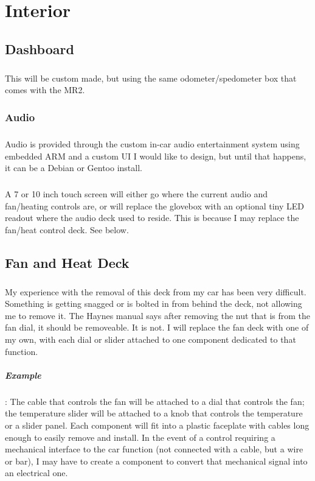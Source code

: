\documentclass[a4paper,10pt]{report}
\begin{document}
\chapter{Interior}
\section{Dashboard}
\paragraph*{}This will be custom made, but using the same odometer/spedometer box that comes with the MR2. 
\subsection{Audio}
\paragraph*{}Audio is provided through the custom in-car audio entertainment system using embedded ARM and a custom UI I would like to design, but until that happens, it can be a Debian or Gentoo install.
\paragraph*{}A 7 or 10 inch touch screen will either go where the current audio and fan/heating controls are, or will replace the glovebox with an optional tiny LED readout where the audio deck used to reside. This is because I may replace the fan/heat control deck. See below.
\section{Fan and Heat Deck}
\paragraph*{}My experience with the removal of this deck from my car has been very difficult. Something is getting snagged or is bolted in from behind the deck, not allowing me to remove it. The Haynes manual says after removing the nut that is from the fan dial, it should be removeable. It is not. I will replace the fan deck with one of my own, with each dial or slider attached to one component dedicated to that function. 
\paragraph{Example}: The cable that controls the fan will be attached to a dial that controls the fan; the temperature slider will be attached to a knob that controls the temperature or a slider panel. Each component will fit into a plastic faceplate with cables long enough to easily remove and install. In the event of a control requiring a mechanical interface to the car function (not connected with a cable, but a wire or bar), I may have to create a component to convert that mechanical signal into an electrical one.
\end{document}
